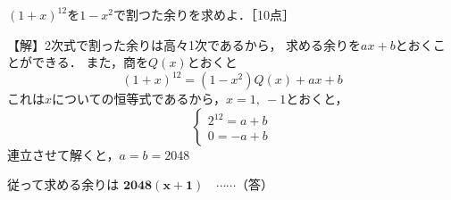 \documentclass[b4paper,landscape,fleqn]{jarticle}
\begin{document}
\begin{sheet}
\begin{column}
  \item $(1+x)^{12}$を$1-x^2$で割つた余りを求めよ．［10点］

      \noindent
      【解】2次式で割った余りは高々1次であるから，
      求める余りを$ax+b$とおくことができる．
      また，商を$Q(x)$とおくと
      \[ (1+x)^{12}=(1-x^2)Q(x)+ax+b \]
      これは$x$についての恒等式であるから，$x=1,~-1$とおくと，
      \[\begin{cases}
        2^{12}=a+b \\
        0=-a+b
      \end{cases}
       \]
      連立させて解くと，$a=b=2048$
      
      従って求める余りは $\bm{2048(x+1)}\quad\cdots \cdots （答）$
\end{column}
\end{sheet}
\end{document}
